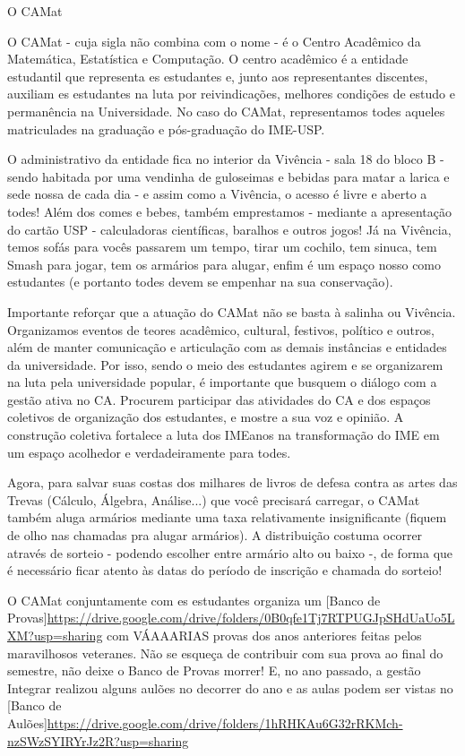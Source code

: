 \begin{secao}{O CAMat}

O CAMat - cuja sigla não combina com o nome - é o Centro Acadêmico da
Matemática, Estatística e Computação. O centro acadêmico é a entidade
estudantil que representa es estudantes e, junto aos representantes discentes, 
auxiliam es estudantes na luta por reivindicações, melhores condições de estudo 
e permanência na Universidade. No caso do CAMat, representamos todes aqueles 
matriculades na graduação e pós-graduação do IME-USP.

O administrativo da entidade fica no interior da Vivência -  sala 18 do bloco B - sendo habitada
por uma vendinha de guloseimas e bebidas para matar a larica e sede nossa de
cada dia - e assim como a Vivência, o acesso é livre e aberto a todes! Além dos
comes e bebes, também emprestamos - mediante a apresentação do cartão USP -
calculadoras científicas, baralhos e outros jogos! Já na Vivência, temos sofás
para vocês passarem um tempo, tirar um cochilo, tem sinuca, tem Smash para jogar,
tem os armários para alugar, enfim é um espaço nosso como estudantes (e portanto 
todes devem se empenhar na sua conservação).

Importante reforçar que a atuação do CAMat não se basta à salinha ou Vivência.
Organizamos eventos de teores acadêmico, cultural, festivos, político e outros, além de manter comunicação 
e articulação com as demais instâncias e entidades da universidade. Por isso, sendo o meio des 
estudantes agirem e se organizarem na luta pela universidade popular, é importante que busquem 
o diálogo com a gestão ativa no CA. Procurem participar das atividades do CA e dos espaços coletivos 
de organização dos estudantes, e mostre a sua voz e opinião. A construção coletiva fortalece a luta 
dos IMEanos na transformação do IME em um espaço acolhedor e verdadeiramente para todes.

Agora, para salvar suas costas dos milhares de livros de defesa contra as artes
das Trevas (Cálculo, Álgebra, Análise...) que você precisará carregar, o CAMat 
também aluga armários mediante uma taxa relativamente insignificante (fiquem de olho 
nas chamadas pra alugar armários). A distribuição costuma ocorrer através de sorteio - 
podendo escolher entre armário alto ou baixo -, de forma que é necessário ficar atento 
às datas do período de inscrição e chamada do sorteio!

O CAMat conjuntamente com es estudantes organiza um
[Banco de Provas]\url{https://drive.google.com/drive/folders/0B0qfe1Tj7RTPUGJpSHdUaUo5LXM?usp=sharing}
com VÁAAARIAS provas dos anos anteriores feitas pelos maravilhosos veteranes.
Não se esqueça de contribuir com sua prova ao final do semestre, não
deixe o Banco de Provas morrer! E, no ano passado, a gestão Integrar realizou alguns aulões no decorrer %
do ano e as aulas podem ser vistas no [Banco de Aulões]\url{https://drive.google.com/drive/folders/1hRHKAu6G32rRKMch-nzSWzSYIRYrJz2R?usp=sharing}


\end{secao}
